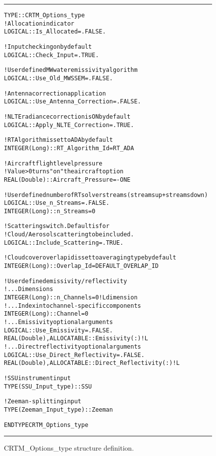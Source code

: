 \begin{figure}[htp]
  \caption{CRTM\_Options\_type structure definition.}
  \label{fig:CRTM_Options_type_structure}
  \centering
  \noindent\rule[0.5ex]{\linewidth}{1pt}
  \begin{alltt}
  TYPE :: CRTM_Options_type
    ! Allocation indicator
    LOGICAL :: Is_Allocated = .FALSE.

    ! Input checking on by default
    LOGICAL :: Check_Input = .TRUE.

    ! User defined MW water emissivity algorithm
    LOGICAL :: Use_Old_MWSSEM = .FALSE.

    ! Antenna correction application
    LOGICAL :: Use_Antenna_Correction = .FALSE.

    ! NLTE radiance correction is ON by default
    LOGICAL :: Apply_NLTE_Correction = .TRUE.

    ! RT Algorithm is set to ADA by default
    INTEGER(Long) :: RT_Algorithm_Id = RT_ADA

    ! Aircraft flight level pressure
    ! Value > 0 turns "on" the aircraft option
    REAL(Double) :: Aircraft_Pressure = -ONE

    ! User defined number of RT solver streams (streams up + streams down)
    LOGICAL       :: Use_n_Streams = .FALSE.
    INTEGER(Long) :: n_Streams = 0

    ! Scattering switch. Default is for
    ! Cloud/Aerosol scattering to be included.
    LOGICAL :: Include_Scattering = .TRUE.

    ! Cloud cover overlap id is set to averaging type by default
    INTEGER(Long) :: Overlap_Id = DEFAULT_OVERLAP_ID

    ! User defined emissivity/reflectivity
    ! ...Dimensions
    INTEGER(Long) :: n_Channels = 0  ! L dimension
    ! ...Index into channel-specific components
    INTEGER(Long) :: Channel = 0
    ! ...Emissivity optional arguments
    LOGICAL :: Use_Emissivity = .FALSE.
    REAL(Double), ALLOCATABLE :: Emissivity(:)  ! L
    ! ...Direct reflectivity optional arguments
    LOGICAL :: Use_Direct_Reflectivity = .FALSE.
    REAL(Double), ALLOCATABLE :: Direct_Reflectivity(:) ! L

    ! SSU instrument input
    TYPE(SSU_Input_type) :: SSU

    ! Zeeman-splitting input
    TYPE(Zeeman_Input_type) :: Zeeman

  END TYPE CRTM_Options_type\end{alltt}
  \noindent\rule[0.5ex]{\linewidth}{1pt}
\end{figure}
